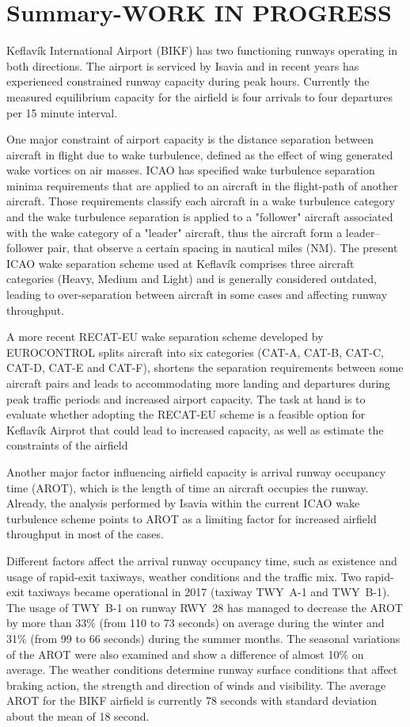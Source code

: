 


\chapter{Summary-WORK IN PROGRESS}\label{cha:summary}

Keflavík International Airport (BIKF) has two functioning runways operating in both directions. The airport is serviced by Isavia and in recent years has experienced constrained runway capacity during peak hours. Currently the measured equilibrium capacity for the airfield is four arrivals to four departures per 15 minute interval. 

One major constraint of airport capacity is the distance separation between aircraft in flight due to wake turbulence, defined as the effect of wing generated wake vortices on air masses. ICAO has specified wake turbulence separation minima requirements that are applied to an aircraft in the flight-path of another aircraft. Those requirements classify each aircraft in a wake turbulence category and the wake turbulence separation is applied to a "follower" aircraft associated with the wake category of a "leader" aircraft, thus the aircraft form a leader--follower pair, that observe a certain spacing in nautical miles (NM). The present ICAO wake separation scheme used at Keflavík comprises three aircraft categories (Heavy, Medium and Light) and is generally considered outdated, leading to over-separation between aircraft in some cases and affecting runway throughput. 

A more recent RECAT-EU wake separation scheme developed by EUROCONTROL splits aircraft into six categories (CAT-A, CAT-B, CAT-C, CAT-D, CAT-E and CAT-F), shortens the separation requirements between some aircraft pairs and leads to accommodating more landing and departures during peak traffic periods and increased airport capacity. The task at hand is to evaluate whether adopting the RECAT-EU scheme is a feasible option for Keflavík Airprot that could lead to increased capacity, as well as estimate the constraints of the airfield

Another major factor influencing airfield capacity is arrival runway occupancy time (AROT), which is the length of time an aircraft occupies the runway.  Already, the analysis performed by Isavia within the current ICAO wake turbulence scheme points to AROT as a limiting factor for increased airfield throughput in most of the cases.  

Different factors affect the arrival runway occupancy time, such as existence and usage of rapid-exit taxiways, weather conditions and the traffic mix. Two rapid-exit taxiways became operational in 2017 (taxiway TWY~A-1 and TWY~B-1). The usage of TWY~B-1 on runway RWY~28 has managed to decrease the AROT by more than 33\% (from 110 to 73 seconds) on average during the winter and 31\% (from 99 to 66 seconds) during the summer months. The seasonal variations of the AROT were also examined and show a difference of almost 10\% on average. The weather conditions determine runway surface conditions that affect braking action, the strength and direction of winds and visibility. The average AROT for the BIKF airfield is currently 78 seconds with standard
deviation about the mean of 18 second.

